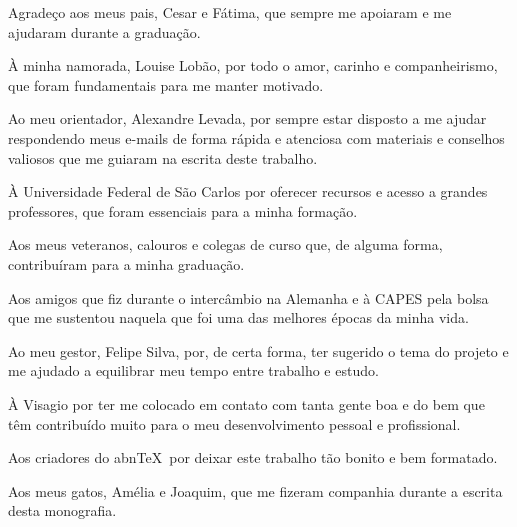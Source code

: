 \begin{agradecimentos}
    Agradeço aos meus pais, Cesar e Fátima, que sempre me apoiaram e me ajudaram durante a graduação.
    
    À minha namorada, Louise Lobão, por todo o amor, carinho e companheirismo, que foram fundamentais para me manter motivado.
    
    Ao meu orientador, Alexandre Levada, por sempre estar disposto a me ajudar respondendo meus e-mails de forma rápida e atenciosa com materiais e conselhos valiosos que me guiaram na escrita deste trabalho.
    
    À Universidade Federal de São Carlos por oferecer recursos e acesso a grandes professores, que foram essenciais para a minha formação.
    
    Aos meus veteranos, calouros e colegas de curso que, de alguma forma, contribuíram para a minha graduação.
    
    Aos amigos que fiz durante o intercâmbio na Alemanha e à CAPES pela bolsa que me sustentou naquela que foi uma das melhores épocas da minha vida.
    
    Ao meu gestor, Felipe Silva, por, de certa forma, ter sugerido o tema do projeto e me ajudado a equilibrar meu tempo entre trabalho e estudo.
    
    À Visagio por ter me colocado em contato com tanta gente boa e do bem que têm contribuído muito para o meu desenvolvimento pessoal e profissional.
    
    Aos criadores do abn\TeX\ por deixar este trabalho tão bonito e bem formatado.

    Aos meus gatos, Amélia e Joaquim, que me fizeram companhia durante a escrita desta monografia.
\end{agradecimentos}